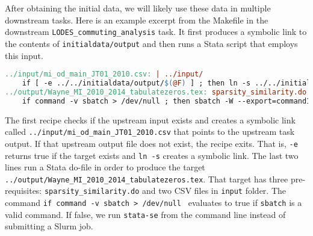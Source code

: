 After obtaining the initial data, we will likely use these data in multiple downstream tasks. 
Here is an example excerpt from the Makefile in the downstream \texttt{LODES\_commuting\_analysis} task.
It first produces a symbolic link to the contents of \texttt{initialdata/output}
and then runs a Stata script that employs this input.
\begin{lstlisting}[language=make]
../input/mi_od_main_JT01_2010.csv: | ../input/
	if [ -e ../../initialdata/output/$(@F) ] ; then ln -s ../../initialdata/output/$(@F) $@ ; else exit 1; fi
../output/Wayne_MI_2010_2014_tabulatezeros.tex: sparsity_similarity.do ../input/mi_od_main_JT01_2010.csv ../input/mi_od_main_JT01_2014.csv
	if command -v sbatch > /dev/null ; then sbatch -W --export=command1='module load stata',command2='stata-se -e sparsity_similarity.do' run.sbatch; else stata-se -e sparsity_similarity.do; fi 	
\end{lstlisting}
The first recipe checks if the upstream input exists and creates a symbolic link called \texttt{../input/mi\_od\_main\_JT01\_2010.csv} that points to the upstream task output.
If that upstream output file does not exist, the recipe exits.
That is, \texttt{-e} returns true if the target exists and \texttt{ln -s} creates a symbolic link.  
The last two lines run a Stata do-file in order to produce the target \texttt{../output/Wayne\_MI\_2010\_2014\_tabulatezeros.tex}.
That target has three pre-requisites: \texttt{sparsity\_similarity.do} and two CSV files in \texttt{input} folder.
The command \texttt{if command -v sbatch > /dev/null } evaluates to true if \texttt{sbatch} is a valid command.
If false, we run \texttt{stata-se} from the command line instead of submitting a Slurm job.
